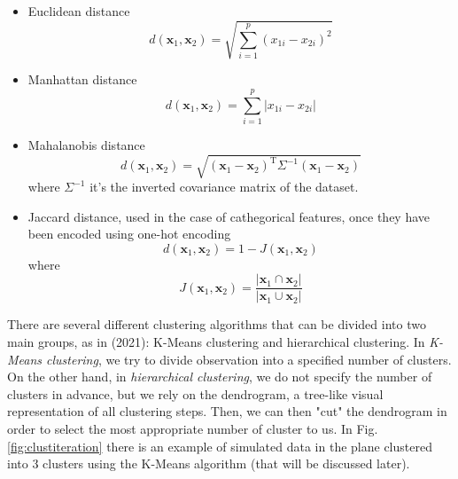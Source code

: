\begin{itemize}
    \item Euclidean distance
\begin{equation}
    \label{eq:euclidean}
    d\left(\mathbf{x}_1,\mathbf{x}_2\right) = \sqrt{\sum_{i=1}^p\left(x_{1i}-x_{2i} \right)^2}
\end{equation}
\item Manhattan distance
\begin{equation}
    \label{eq:mandistance}
    d\left(\mathbf{x}_1,\mathbf{x}_2\right) = \sum_{i=1}^p\left|x_{1i}-x_{2i} \right|
\end{equation}
\item Mahalanobis distance
\begin{equation}
    \label{eq:mahadistance}
    d(\mathbf{x}_1, \mathbf{x}_2) = \sqrt{(\mathbf{x}_1 - \mathbf{x}_2)^\mathrm{T} \Sigma^{-1} (\mathbf{x}_1 - \mathbf{x}_2)}
\end{equation}
where $\Sigma^{-1}$ it's the inverted covariance matrix of the dataset.
\item Jaccard distance, used in the case of cathegorical features, once they have been encoded using one-hot encoding
\begin{equation}
    \label{eq:jaccard}
    d\left(\mathbf{x}_1, \mathbf{x}_2\right) = 1 - J\left(\mathbf{x}_1, \mathbf{x}_2\right)
\end{equation}
where 
\begin{equation}
J\left(\mathbf{x}_1, \mathbf{x}_2\right) = \frac{\left|\mathbf{x}_1 \cap \mathbf{x}_2\right|}{\left|\mathbf{x}_1 \cup \mathbf{x}_2\right|}    
\end{equation}
\end{itemize}
There are several different clustering algorithms that can be divided into two main groups, as in \citeauthor{james_introduction_2021} (2021): K-Means clustering and hierarchical clustering. In \emph{K-Means clustering}, we try to divide observation into a specified number of clusters. On the other hand, in \emph{hierarchical clustering}, we do not specify the number of clusters in advance, but we rely on the dendrogram, a tree-like visual representation of all clustering steps. Then, we can then "cut" the dendrogram in order to select the most appropriate number of cluster to us. In Fig. \ref{fig:clustiteration} there is an example of simulated data in the plane clustered into 3 clusters using the K-Means algorithm (that will be discussed later).



